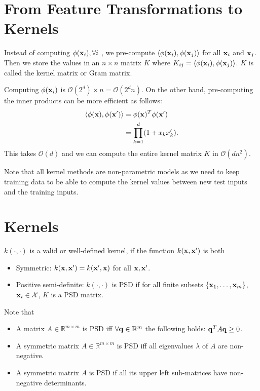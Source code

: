 

\section{From Feature Transformations to Kernels}
\label{sec:kernel:kernels}
Instead of computing $\phi({\mathbf{x}}_i), \forall i$ , we pre-compute $\langle \phi({\mathbf{x}}_i), \phi({\mathbf{x}}_j)\rangle$ for all ${\mathbf{x}}_i$ and ${\mathbf{x}}_j$. Then we store the values in an $n\times n$ matrix $K$ where $K_{ij}= \langle \phi({\mathbf{x}}_i), \phi({\mathbf{x}}_j)\rangle$. $K$ is called the kernel matrix or Gram matrix. 

Computing $\phi({\mathbf{x}}_i)$ is $\mathcal{O}(2^d)\times n = \mathcal{O}(2^dn)$. On the other hand, pre-computing the inner products can be more efficient as follows:
\begin{align*}
	\langle \phi({\mathbf{x}}), \phi({\mathbf{x}}')\rangle &= \phi({\mathbf{x}})^T\phi({\mathbf{x}}')\\ 
										   &= \prod_{k=1}^d(1+x_kx'_k).
\end{align*}
This takes $\mathcal{O}(d)$ and we can compute the entire kernel matrix $K$ in $\mathcal{O}(dn^2)$. 

Note that all kernel methods are non-parametric models as we need to keep training data to be able to compute the kernel values between new test inputs and the training inputs.

\section{Kernels}
\label{sec:kernel:kernel_def}

$k(\cdot, \cdot)$ is a valid or well-defined kernel, if the function $k({\mathbf{x}}, {\mathbf{x}}')$ is both 
\begin{itemize}
	\item Symmetric: $k({\mathbf{x}}, {\mathbf{x}}') = k({\mathbf{x}}', {\mathbf{x}})$ for all ${\mathbf{x}}, {\mathbf{x}}'$.
	\item Positive semi-definite: $k(\cdot, \cdot)$ is PSD if for all finite subsets $\{{\mathbf{x}}_1,\dots,{\mathbf{x}}_m\}$, ${\mathbf{x}}_i\in \mathcal{X}$, $K$ is a PSD matrix. 
\end{itemize}

Note that 
\begin{itemize}
	\item A matrix $A\in \mathbb{R}^{m\times m}$ is PSD iff $\forall {\mathbf{q}}\in \mathbb{R}^m$ the following holds: ${\mathbf{q}}^TA{\mathbf{q}}\geq 0$.
	\item A symmetric matrix $A\in \mathbb{R}^{m\times m}$ is PSD iff all eigenvalues $\lambda$ of $A$ are non-negative. 
	\item A symmetric matrix $A$ is PSD if all its upper left sub-matrices have non-negative determinants.
\end{itemize}

